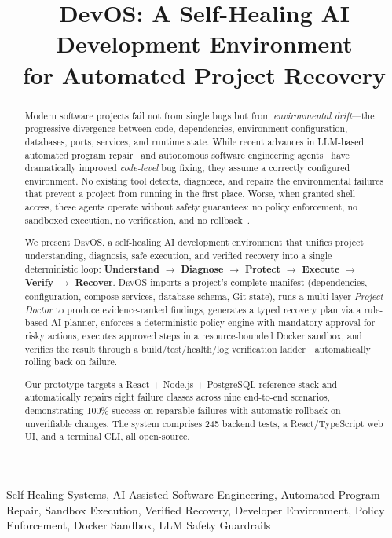 \documentclass[conference,10pt,caption=false]{IEEEtran}
\title{DevOS: A Self-Healing AI Development Environment\\for Automated Project Recovery}
\author{
\IEEEauthorblockN{Harshit\IEEEauthorrefmark{1}, Ravent\IEEEauthorrefmark{1}, Isha\IEEEauthorrefmark{1}}
\IEEEauthorblockA{
\IEEEauthorrefmark{1}Vivekananda Institute of Professional Studies - Technical Campus\\
Affiliated to GGSIP University, Delhi\\
\{01717702723, 04417702723, 03717702723\}@vips.edu
}
}
\newcommand{\devos}{\textsc{DevOS}\xspace}
\begin{document}
\maketitle

\begin{abstract}
Modern software projects fail not from single bugs but from \textit{environmental drift}---the progressive divergence between code, dependencies, environment configuration, databases, ports, services, and runtime state. While recent advances in LLM-based automated program repair~\cite{llm-apr-survey-2025} and autonomous software engineering agents~\cite{swe-bench, swe-agent, devin} have dramatically improved \textit{code-level} bug fixing, they assume a correctly configured environment. No existing tool detects, diagnoses, and repairs the environmental failures that prevent a project from running in the first place. Worse, when granted shell access, these agents operate without safety guarantees: no policy enforcement, no sandboxed execution, no verification, and no rollback~\cite{security-audit, llm-code-security}.

We present \devos, a self-healing AI development environment that unifies project understanding, diagnosis, safe execution, and verified recovery into a single deterministic loop: \textbf{Understand $\to$ Diagnose $\to$ Protect $\to$ Execute $\to$ Verify $\to$ Recover}. \devos imports a project's complete manifest (dependencies, configuration, compose services, database schema, Git state), runs a multi-layer \textit{Project Doctor} to produce evidence-ranked findings, generates a typed recovery plan via a rule-based AI planner, enforces a deterministic policy engine with mandatory approval for risky actions, executes approved steps in a resource-bounded Docker sandbox, and verifies the result through a build/test/health/log verification ladder---automatically rolling back on failure.

Our prototype targets a React + Node.js + PostgreSQL reference stack and automatically repairs eight failure classes across nine end-to-end scenarios, demonstrating 100\% success on reparable failures with automatic rollback on unverifiable changes. The system comprises 245 backend tests, a React/TypeScript web UI, and a terminal CLI, all open-source.
\end{abstract}

\begin{IEEEkeywords}
Self-Healing Systems, AI-Assisted Software Engineering, Automated Program Repair, Sandbox Execution, Verified Recovery, Developer Environment, Policy Enforcement, Docker Sandbox, LLM Safety Guardrails
\end{IEEEkeywords}
\end{document}
